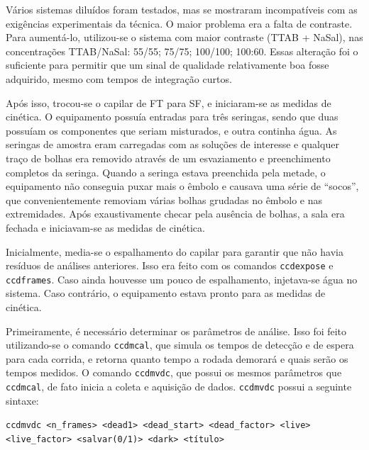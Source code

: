 			Vários sistemas diluídos foram testados, mas se mostraram incompatíveis com as exigências experimentais da técnica. O maior problema era a falta de contraste. Para aumentá-lo, utilizou-se o sistema com maior contraste (TTAB + NaSal), nas concentrações TTAB/NaSal: 55/55; 75/75; 100/100; 100:60. Essas alteração foi o suficiente para permitir que um sinal de qualidade relativamente boa fosse adquirido, mesmo com tempos de integração curtos.
			
			Após isso, trocou-se o capilar de FT para SF, e iniciaram-se as medidas de cinética. O equipamento possuía entradas para três seringas, sendo que duas possuíam os componentes que seriam misturados, e outra continha água. As seringas de amostra eram carregadas com as soluções de interesse e qualquer traço de bolhas era removido através de um esvaziamento e preenchimento completos da seringa. Quando a seringa estava preenchida pela metade, o equipamento não conseguia puxar mais o êmbolo e causava uma série de ``socos'', que convenientemente removiam várias bolhas grudadas no êmbolo e nas extremidades. Após exaustivamente checar pela ausência de bolhas, a sala era fechada e iniciavam-se as medidas de cinética. 
			
			Inicialmente, media-se o espalhamento do capilar para garantir que não havia resíduos de análises anteriores. Isso era feito com os comandos \texttt{ccdexpose} e \texttt{ccdframes}. Caso ainda houvesse um pouco de espalhamento, injetava-se água no sistema. Caso contrário, o equipamento estava pronto para as medidas de cinética.
			
			
			Primeiramente, é necessário determinar os parâmetros de análise. Isso foi feito utilizando-se o comando \texttt{ccdmcal}, que simula os tempos de detecção e de espera para cada corrida, e retorna quanto tempo a rodada demorará e quais serão os tempos medidos. O comando \texttt{ccdmvdc}, que possui os mesmos parâmetros que \texttt{ccdmcal}, de fato inicia a coleta e aquisição de dados. \texttt{ccdmvdc} possui a seguinte sintaxe:
			
			\begin{center}
				\texttt{ccdmvdc <n\_frames> <dead1> <dead\_start> <dead\_factor> <live>\\ <live\_factor> 	<salvar(0/1)> <dark> <título>}
			\end{center}

